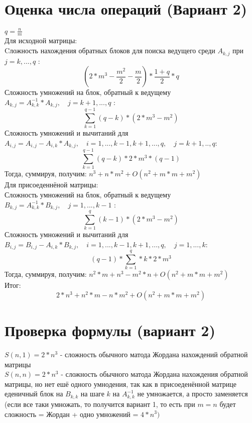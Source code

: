 \documentclass[a4paper,12pt]{article}
\begin{document}
\section{Оценка числа операций (Вариант 2)}
$q = \frac{n}{m}$\\
Для исходной матрицы:\\
Cложность нахождения обратных блоков для поиска ведущего среди $A_{k,j}$ при $j = k,...,q$ :\\
$$(2*m^{3} - \frac{m^{2}}{2} - \frac{m}{2}) * \frac{1 + q}{2} * q$$ 
Сложность умножений на блок, обратный к ведущему $A_{k, j} = A_{k, k}^{-1} * A_{k, j},
\quad j = k + 1,...,q$ :\\
$$\sum\limits_{k=1}^{q-1}(q - k)*(2*m^{3}-m^{2})$$
Сложность умножений и вычитаний для 
$A_{i, j} = A_{i, j} - A_{i, k} * A_{k, j}, \quad i = 1,...,k-1,k+1,...,q,
\quad j = k + 1,..,q$:\\
$$\sum\limits_{k=1}^{q-1}(q-k)*2*m^{3}*(q-1)$$
Тогда, суммируя, получим: $n^{3} + n*m^{2} + O(n^{2} + m*m + m^{2})$\\
Для присоеденнёной матрицы:\\
Сложность умножений на блок, обратный к ведущему $B_{k, j} = A_{k, k}^{-1} * B_{k, j},
\quad j = 1,...,k-1$ :\\
$$\sum\limits_{k=1}^{q}(k-1)*(2*m^{3} - m^{2})$$
Сложность умножений и вычитаний для 
$B_{i, j} = B_{i, j} - A_{i, k} * B_{k, j}, \quad i = 1,...,k-1,k+1,...,q,
\quad j = 1,...,k$:\\
$$(q-1)*\sum\limits_{k=1}^{q}*k*2*m^{3}$$
Тогда, суммируя, получим: $n^{2}*m + n^{3} - m^{2} * n + O(n^{2} + m*m + m^{2})$\\
Итог: $$2*n^{3} + n^{2}*m - n*m^{2} + O(n^{2} + m*m + m^{2})$$

\section{Проверка формулы (вариант 2)}
$S(n, 1) = 2*n^{3}$ - сложность обычного матода Жордана нахождений обратной матрицы\\
$S(n, n) = 2*n^{3}$ - сложность обычного матода Жордана нахождения обратной матрицы,
но нет ешё одного умнодения, так как в присоеденённой матрице еденичный блок на 
$B_{k, k}$ на шаге $k$ на $A_{k,k}^{-1}$ не умножается, а просто заменяется
(если все таки умножать, то получится вариант 1, то есть при $m=n$ будет
сложность = Жордан + одно умножений = $4*n^{3})$
\end{document}
